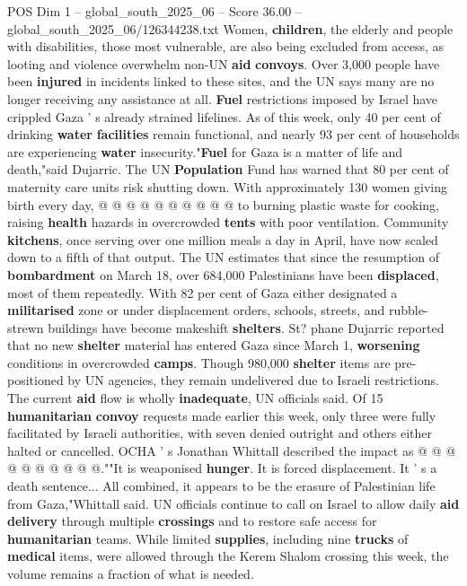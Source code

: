 \begin{textsample}{POS Dim 1 – global\_south\_2025\_06 – Score 36.00 – global\_south\_2025\_06/126344238.txt}
Women, \textbf{children}, the elderly and people with disabilities, those most vulnerable, are also being excluded from access, as looting and violence overwhelm non-UN \textbf{aid} \textbf{convoys}.
Over 3,000 people have been \textbf{injured} in incidents linked to these sites, and the UN says many are no longer receiving any assistance at all. \textbf{Fuel} restrictions imposed by Israel have crippled Gaza ' s already strained lifelines.
As of this week, only 40 per cent of drinking \textbf{water} \textbf{facilities} remain functional, and nearly 93 per cent of households are experiencing \textbf{water} insecurity."\textbf{Fuel} for Gaza is a matter of life and death,"said Dujarric.
The UN \textbf{Population} Fund has warned that 80 per cent of maternity care units risk shutting down.
With approximately 130 women giving birth every day, @ @ @ @ @ @ @ @ @ @ to burning plastic waste for cooking, raising \textbf{health} hazards in overcrowded \textbf{tents} with poor ventilation.
Community \textbf{kitchens}, once serving over one million meals a day in April, have now scaled down to a fifth of that output.
The UN estimates that since the resumption of \textbf{bombardment} on March 18, over 684,000 Palestinians have been \textbf{displaced}, most of them repeatedly.
With 82 per cent of Gaza either designated a \textbf{militarised} zone or under displacement orders, schools, streets, and rubble-strewn buildings have become makeshift \textbf{shelters}.
St? phane Dujarric reported that no new \textbf{shelter} material has entered Gaza since March 1, \textbf{worsening} conditions in overcrowded \textbf{camps}.
Though 980,000 \textbf{shelter} items are pre-positioned by UN agencies, they remain undelivered due to Israeli restrictions.
The current \textbf{aid} flow is wholly \textbf{inadequate}, UN officials said.
Of 15 \textbf{humanitarian} \textbf{convoy} requests made earlier this week, only three were fully facilitated by Israeli authorities, with seven denied outright and others either halted or cancelled.
OCHA ' s Jonathan Whittall described the impact as @ @ @ @ @ @ @ @ @ @.""It is weaponised \textbf{hunger}.
It is forced displacement.
It ' s a death sentence...
All combined, it appears to be the erasure of Palestinian life from Gaza,"Whittall said.
UN officials continue to call on Israel to allow daily \textbf{aid} \textbf{delivery} through multiple \textbf{crossings} and to restore safe access for \textbf{humanitarian} teams.
While limited \textbf{supplies}, including nine \textbf{trucks} of \textbf{medical} items, were allowed through the Kerem Shalom crossing this week, the volume remains a fraction of what is needed.

\end{textsample}
